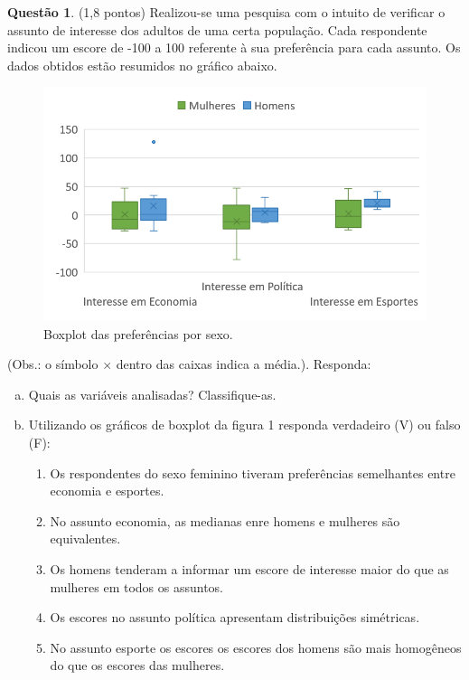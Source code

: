 \documentclass[a4paper,11pt]{article}
\theoremstyle{definition}
\newtheorem{exe}{Questão}
\begin{document}
\medskip
\begin{exe}(1,8 pontos)
Realizou-se uma pesquisa com o intuito de verificar o assunto de interesse dos adultos de uma certa população. Cada respondente indicou um escore de -100 a 100 referente à sua preferência para cada assunto. Os dados obtidos estão resumidos no gráfico abaixo. 
\begin{figure}[h!]
  \centering
  \includegraphics[width=0.6\linewidth]{boxplot_prova_2017_2.png} 
  \caption{Boxplot das preferências por sexo.}
  \label{Fig1}
\end{figure}
(Obs.: o símbolo $\times$ dentro das caixas indica a média.).
Responda:
\begin{enumerate}[(a)]
  \item Quais as variáveis analisadas? Classifique-as. \\
  \item Utilizando os gráficos de boxplot da figura 1 responda verdadeiro (V) 
  ou falso (F):
  \begin{enumerate}[(\quad)]
    \item Os respondentes do sexo feminino tiveram preferências semelhantes 
    entre economia e esportes.
    \item No assunto economia, as medianas enre homens e mulheres 
    são equivalentes.
    \item Os homens tenderam a informar um escore de interesse maior do que as 
    mulheres em todos os assuntos.
    \item Os escores no assunto política apresentam distribuições simétricas.
    \item No assunto esporte os escores os escores dos homens são mais homogêneos 
    do que os escores das mulheres.
  \end{enumerate}
\end{enumerate}
\end{exe}
\end{document}
